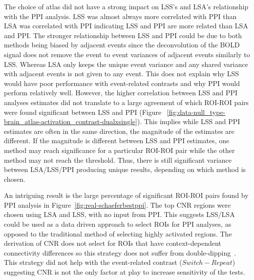 \documentclass[phd,appendix,figures]{uithesis}
\begin{document}
The choice of atlas did not have a strong impact on LSS's and LSA's relationship with
the PPI analysis.
LSS was almost always more correlated with PPI than LSA was correlated with PPI indicating
LSS and PPI are more related than LSA and PPI.
The stronger relationship between LSS and PPI could be due to both methods being biased by adjacent
events since the deconvolution of the BOLD signal does not remove the event to event
variances of adjacent events similarly to LSS.
Whereas LSA only keeps the unique event variance and any shared variance with adjacent events
is not given to any event.
This does not explain why LSS would have poor performance with event-related contrasts
and why PPI would perform relatively well. 
However, the higher correlation between LSS and PPI analyses estimates
did not translate to a large agreement of which ROI-ROI pairs were found
significant between LSS and PPI (Figure ~\ref{fig:data-null_type-brain_atlas-activation_contrast-dualxsingle}).
This implies while LSS and PPI estimates are often in the same direction, the magnitude
of the estimates are different.
If the magnitude is different between LSS and PPI estimates,
one method may reach significance for a particular ROI-ROI pair while the other method
may not reach the threshold.
Thus, there is still significant variance between LSA/LSS/PPI producing unique results,
depending on which method is chosen.

An intriguing result is the large percentage of significant ROI-ROI pairs found by
PPI analysis in Figure~\ref{fig:real-schaeferbestppi}.
The top CNR regions were chosen using LSA and LSS, with no input from PPI.
This suggests LSS/LSA could be used as a data driven approach to select ROIs
for PPI analyses, as opposed to the traditional method of selecting
highly activated regions.
The derivation of CNR does not select for ROIs that have context-dependent
connectivity differences so this strategy does not suffer from
double-dipping~\cite{Kriegeskorte2009}.
This strategy did not help with the event-related contrast ($Switch - Repeat$)
suggesting CNR is not the only factor at play to increase sensitivity of
the tests.
\end{document}
